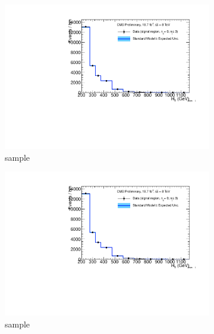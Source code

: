 \begin{figure}[h!]
\begin{subfigure}[b]{0.48\textwidth}
    \includegraphics[width=\textwidth,page=4]
    {Figs/results/v0/blueBand/bestFit_2012dev_RQcdZero_fZinvAll_0b_le3j-12hp_smOnly}
    \caption{\mj sample}
  \end{subfigure}
  \begin{subfigure}[b]{0.48\textwidth}
    \includegraphics[width=\textwidth,page=8]
    {Figs/results/v0/blueBand/bestFit_2012dev_RQcdZero_fZinvAll_0b_le3j-12hp_smOnly}
    \caption{\mmj sample}
  \end{subfigure}\\
  \begin{subfigure}[b]{0.48\textwidth}

\end{subfigure}
\end{figure}
